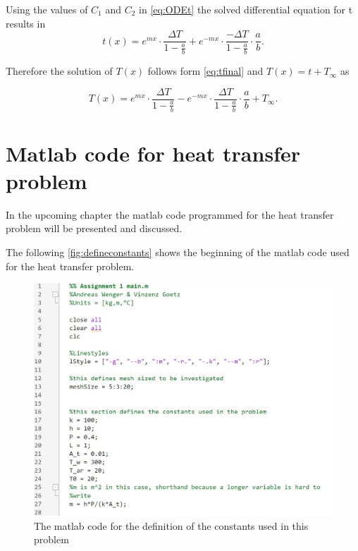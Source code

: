 Using the values of $C_1$ and $C_2$ in \autoref{eq:ODEt} the solved differential equation for t results in
\begin{equation}
\label{eq:tfinal}
t(x) = e^{mx} \cdot \frac{\Delta T}{1 - \frac{a}{b}} + e^{-mx} \cdot \frac{-\Delta T}{1 - \frac{a}{b}} \cdot \frac{a}{b}.
\end{equation}

Therefore the solution of $T(x)$ follows form \autoref{eq:tfinal} and $T(x) = t + T_{\infty}$ as 

\begin{equation}
T(x) = e^{mx} \cdot \frac{\Delta T}{1 - \frac{a}{b}} - e^{-mx} \cdot \frac{\Delta T}{1 - \frac{a}{b}} \cdot \frac{a}{b} + T_\infty.
\end{equation}


\chapter{Matlab code for heat transfer problem}
\label{ch:matlabcode}

In the upcoming chapter the matlab code programmed for the heat transfer problem will be presented and discussed. 


The following \autoref{fig:defineconstants} shows the beginning of the matlab code used for the heat transfer problem. 

\begin{figure}[H]
    \centering
    \includegraphics[width=.8\textwidth]{figures/define_constants.jpg}
    \caption{The matlab code for the definition of the constants used in this problem}
    \label{fig:defineconstants}
\end{figure}

